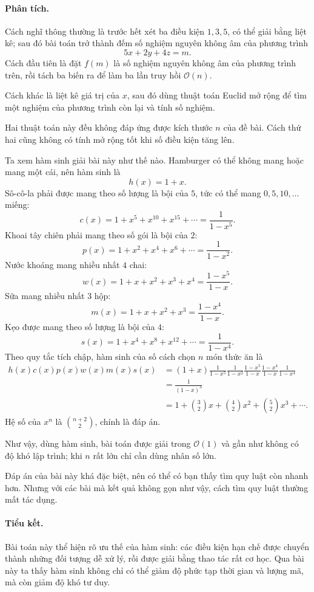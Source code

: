 \documentclass[11pt]{article}
\newcommand{\Oh}{\mathcal{O}}
\newcommand{\C}[2]{\binom{#1}{#2}}
\begin{document}
\paragraph{Phân tích.}
Cách nghĩ thông thường là trước hết xét ba điều kiện \(1,3,5\), có thể giải
bằng liệt kê; sau đó bài toán trở thành đếm số nghiệm nguyên không âm của
phương trình
\[
  5x+2y+4z=m.
\]
Cách đầu tiên là đặt \(f(m)\) là số nghiệm nguyên không âm của phương trình
trên, rồi tách ba biến ra để làm ba lần truy hồi \(\Oh(n)\).

Cách khác là liệt kê giá trị của \(x\), sau đó dùng thuật toán Euclid mở rộng
để tìm một nghiệm của phương trình còn lại và tính số nghiệm.

Hai thuật toán này đều không đáp ứng được kích thước \(n\) của đề bài. Cách
thứ hai cũng không có tính mở rộng tốt khi số điều kiện tăng lên.

Ta xem hàm sinh giải bài này như thế nào. Hamburger có thể không mang hoặc
mang một cái, nên hàm sinh là
\[
  h(x)=1+x.
\]
Sô-cô-la phải được mang theo số lượng là bội của \(5\), tức có thể mang
\(0,5,10,\ldots\) miếng:
\[
  c(x)=1+x^5+x^{10}+x^{15}+\cdots=\frac1{1-x^5}.
\]
Khoai tây chiên phải mang theo số gói là bội của \(2\):
\[
  p(x)=1+x^2+x^4+x^6+\cdots=\frac1{1-x^2}.
\]
Nước khoáng mang nhiều nhất \(4\) chai:
\[
  w(x)=1+x+x^2+x^3+x^4=\frac{1-x^5}{1-x}.
\]
Sữa mang nhiều nhất \(3\) hộp:
\[
  m(x)=1+x+x^2+x^3=\frac{1-x^4}{1-x}.
\]
Kẹo được mang theo số lượng là bội của \(4\):
\[
  s(x)=1+x^4+x^8+x^{12}+\cdots=\frac1{1-x^4}.
\]
Theo quy tắc tích chập, hàm sinh của số cách chọn \(n\) món thức ăn là
\[
\begin{aligned}
  h(x)c(x)p(x)w(x)m(x)s(x)
  &=(1+x)\frac1{1-x^5}\frac1{1-x^2}
    \frac{1-x^5}{1-x}\frac{1-x^4}{1-x}\frac1{1-x^4}\\
  &=\frac1{(1-x)^3}\\
  &=1+\C{3}{2}x+\C{4}{2}x^2+\C{5}{2}x^3+\cdots.
\end{aligned}
\]
Hệ số của \(x^n\) là \(\C{n+2}{2}\), chính là đáp án.

Như vậy, dùng hàm sinh, bài toán được giải trong \(\Oh(1)\) và gần như không
có độ khó lập trình; khi \(n\) rất lớn chỉ cần dùng nhân số lớn.

Đáp án của bài này khá đặc biệt, nên có thể có bạn thấy tìm quy luật còn
nhanh hơn. Nhưng với các bài mà kết quả không gọn như vậy, cách tìm quy luật
thường mất tác dụng.

\paragraph{Tiểu kết.}
Bài toán này thể hiện rõ ưu thế của hàm sinh: các điều kiện hạn chế được
chuyển thành những đối tượng dễ xử lý, rồi được giải bằng thao tác rất cơ
học. Qua bài này ta thấy hàm sinh không chỉ có thể giảm độ phức tạp thời gian
và lượng mã, mà còn giảm độ khó tư duy.
\end{document}
